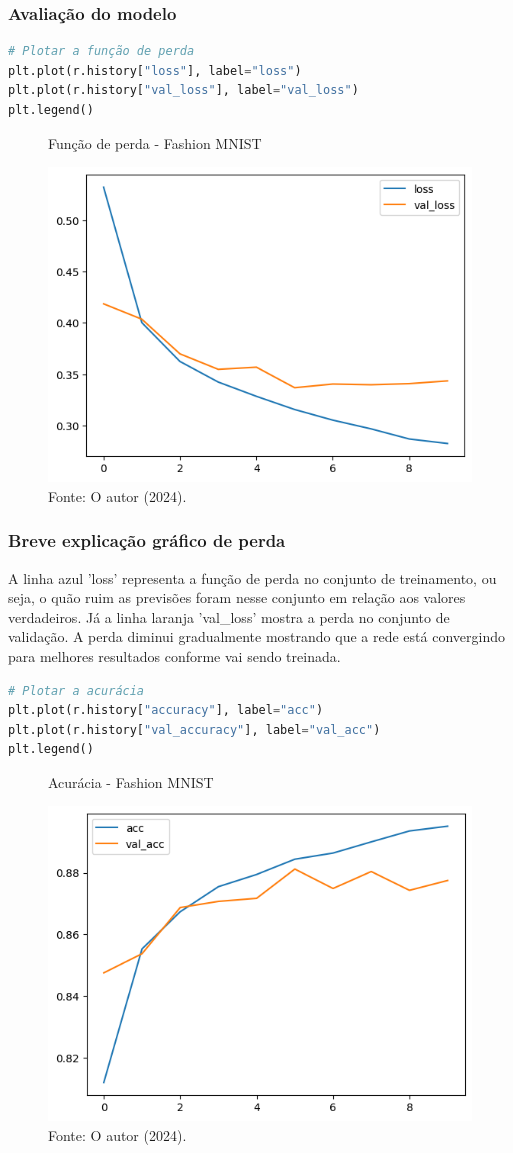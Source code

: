 \subsubsection*{Avaliação do modelo}
\begin{lstlisting}[language=Python, style=input]
# Plotar a função de perda
plt.plot(r.history["loss"], label="loss")
plt.plot(r.history["val_loss"], label="val_loss")
plt.legend()
\end{lstlisting}
\begin{figure}[H]
\centering
\caption{Função de perda - Fashion MNIST}
\includegraphics[width=.8\linewidth]{apendices/fig/13_IAA012_1.png}
\caption*{Fonte: O autor (2024).}
\end{figure}
\subsubsection*{Breve explicação gráfico de perda}
A linha azul 'loss' representa a função de perda no conjunto de treinamento, ou seja, o quão ruim as previsões foram nesse conjunto em relação aos valores verdadeiros. Já a linha laranja 'val\_loss' mostra a perda no conjunto de validação. A perda diminui gradualmente mostrando que a rede está convergindo para melhores resultados conforme vai sendo treinada.
\begin{lstlisting}[language=Python, style=input]
# Plotar a acurácia
plt.plot(r.history["accuracy"], label="acc")
plt.plot(r.history["val_accuracy"], label="val_acc")
plt.legend()
\end{lstlisting}
\begin{figure}[H]
\centering
\caption{Acurácia - Fashion MNIST}
\includegraphics[width=.8\linewidth]{apendices/fig/13_IAA012_2.png}
\caption*{Fonte: O autor (2024).}
\end{figure}
